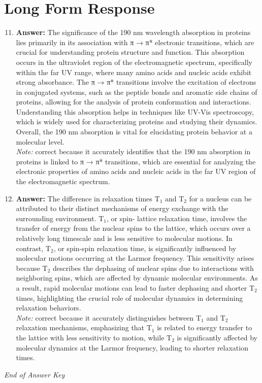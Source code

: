 \documentclass[12pt]{article}
\begin{document}
\section*{Long Form Response}
\begin{enumerate}[label=\arabic*.]
\setcounter{enumi}{10}
\item \textbf{Answer:} The significance of the 190 nm wavelength absorption in proteins lies primarily in its association with π → π* electronic transitions, which are crucial for understanding protein structure and function. This absorption occurs in the ultraviolet region of the electromagnetic spectrum, specifically within the far UV range, where many amino acids and nucleic acids exhibit strong absorbance. The π → π* transitions involve the excitation of electrons in conjugated systems, such as the peptide bonds and aromatic side chains of proteins, allowing for the analysis of protein conformation and interactions. Understanding this absorption helps in techniques like UV-Vis spectroscopy, which is widely used for characterizing proteins and studying their dynamics. Overall, the 190 nm absorption is vital for elucidating protein behavior at a molecular level.
\\ \textit{Note:} correct because it accurately identifies that the 190 nm absorption in proteins is linked to π → π* transitions, which are essential for analyzing the electronic properties of amino acids and nucleic acids in the far UV region of the electromagnetic spectrum.
\item \textbf{Answer:} The difference in relaxation times T$_{1}$ and T$_{2}$ for a nucleus can be attributed to their distinct mechanisms of energy exchange with the surrounding environment. T$_{1}$, or spin- lattice relaxation time, involves the transfer of energy from the nuclear spins to the lattice, which occurs over a relatively long timescale and is less sensitive to molecular motions. In contrast, T$_{2}$, or spin-spin relaxation time, is significantly influenced by molecular motions occurring at the Larmor frequency. This sensitivity arises because T$_{2}$ describes the dephasing of nuclear spins due to interactions with neighboring spins, which are affected by dynamic molecular environments. As a result, rapid molecular motions can lead to faster dephasing and shorter T$_{2}$ times, highlighting the crucial role of molecular dynamics in determining relaxation behaviors.
\\ \textit{Note:} correct because it accurately distinguishes between T$_{1}$ and T$_{2}$ relaxation mechanisms, emphasizing that T$_{1}$ is related to energy transfer to the lattice with less sensitivity to motion, while T$_{2}$ is significantly affected by molecular dynamics at the Larmor frequency, leading to shorter relaxation times.
\end{enumerate}

\vfill
\noindent\textit{End of Answer Key}
\end{document}
